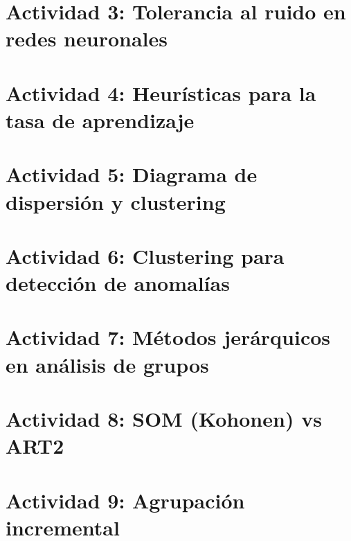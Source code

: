 \documentclass[12pt,a4paper]{article}
\theoremstyle{definition}
\theoremstyle{plain}
\theoremstyle{remark}
\begin{document}
\section{Actividad 3: Tolerancia al ruido en redes neuronales}


\section{Actividad 4: Heurísticas para la tasa de aprendizaje}


\section{Actividad 5: Diagrama de dispersión y clustering}


\section{Actividad 6: Clustering para detección de anomalías}


\section{Actividad 7: Métodos jerárquicos en análisis de grupos}


\section{Actividad 8: SOM (Kohonen) vs ART2}


\section{Actividad 9: Agrupación incremental}

\end{document}
